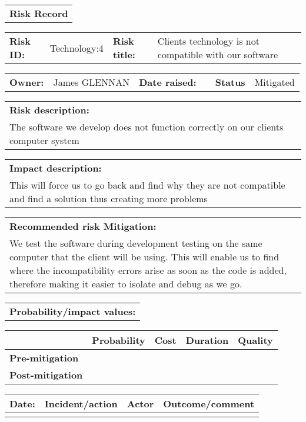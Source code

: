 \begin{table}
	\begin{tabularx}{\textwidth}{| X |}
		\hline
		\textbf{Risk Record} \\
	\end{tabularx}
	\begin{tabularx}{\textwidth}{| l | X | l | X |}
		\hline
		\textbf{Risk ID:} & Technology:4 & \textbf{Risk title:} & Clients technology is not compatible with our software \\
	\end{tabularx}
	\begin{tabularx}{\textwidth}{| l | X | l | X | l | X |}
		\hline
		\textbf{Owner:} & James GLENNAN & \textbf{Date raised:} &  & \textbf{Status} & Mitigated \\
	\end{tabularx}
	\begin{tabularx}{\textwidth}{| X |}
		\hline
		\textbf{Risk description:} \\ The software we develop does not function correctly on our clients computer system  \\
	\end{tabularx}
	\begin{tabularx}{\textwidth}{| X |}
		\hline
		\textbf{Impact description:} \\ This will force us to go back and find why they are not compatible and find a solution thus creating more problems \\
	\end{tabularx}
	\begin{tabularx}{\textwidth}{| X |}
		\hline
		\textbf{Recommended risk Mitigation:} \\ We test the software during development testing on the same computer that the client will be using. This will enable us to find where the incompatibility errors arise as soon as the code is added, therefore making it easier to isolate and debug as we go. \\
	\end{tabularx}
	\begin{tabularx}{\textwidth}{| X |}
		\hline
		\textbf{Probability/impact values:} \\
	\end{tabularx}
	\begin{tabularx}{\textwidth}{| l | l | X | X | X |}
		\hline
		 &  \textbf{Probability} & \textbf{Cost} & \textbf{Duration} & \textbf{Quality} \\ \hline
		\textbf{Pre-mitigation} & & & & \\ \hline
		\textbf{Post-mitigation} & & & & \\ \hline \hline
	\end{tabularx}
	\begin{tabularx}{\textwidth}{| l | X | l | X |}
		\hline
		\textbf{Date:} & \textbf{Incident/action} & \textbf{Actor} & \textbf{Outcome/comment} \\ \hline
		 &  &  &  \\ \hline
	\end{tabularx}
\end{table}

